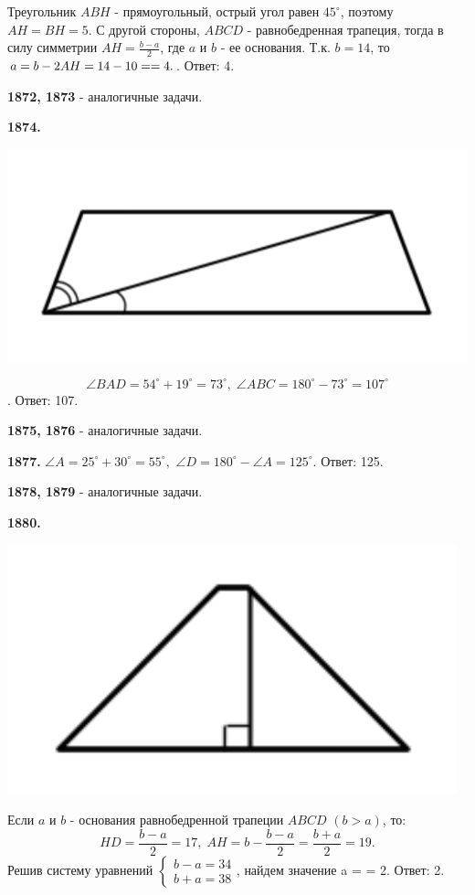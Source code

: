 Треугольник $ABH$ - прямоугольный, острый угол равен $45^\circ$, поэтому $AH = BH = 5$. С другой стороны, $ABCD$ - равнобедренная трапеция, тогда в силу симметрии $AH = \frac{b - a}{2}$, где $a$ и $b$ - ее основания. Т.к. $b = 14$, то $a = b - 2AH = 14 - 10 = \linebreak = 4.$. \newline \null \hspace*{\fill} Ответ: 4.

\textbf{1872, 1873} - аналогичные задачи.

\textbf{1874.}

{\centering \includegraphics[width=0.5\linewidth]{Geometry/Content/21.png}
	
}
\[
\angle BAD = 54^\circ + 19^\circ = 73^\circ, \;\angle ABC = 180^\circ - 73^\circ = 107^\circ
\].\null \hspace*{\fill} Ответ: 107.

\textbf{1875, 1876} - аналогичные задачи.

\textbf{1877.} $\angle A = 25^\circ + 30^\circ = 55^\circ,$ $\angle D = 180^\circ - \angle A = 125^\circ.$ \newline \null \hspace*{\fill} Ответ: 125.

\textbf{1878, 1879} - аналогичные задачи.

\textbf{1880.}

{\centering \includegraphics[width=0.4\linewidth]{Geometry/Content/22.png}
	
}
 
 Если $a$ и $b$ - основания равнобедренной трапеции $ABCD$ $(b > a)$, то:
\[
HD = \frac{b - a}{2} = 17,\; AH = b - \frac{b - a}{2} = \frac{b + a}{2} = 19.
\]
Решив систему уравнений  $\begin{cases} b - a =34 \\ b + a = 38 \end{cases}$, найдем значение a = \linebreak = 2. \newline \null \hspace*{\fill} Ответ: 2.

